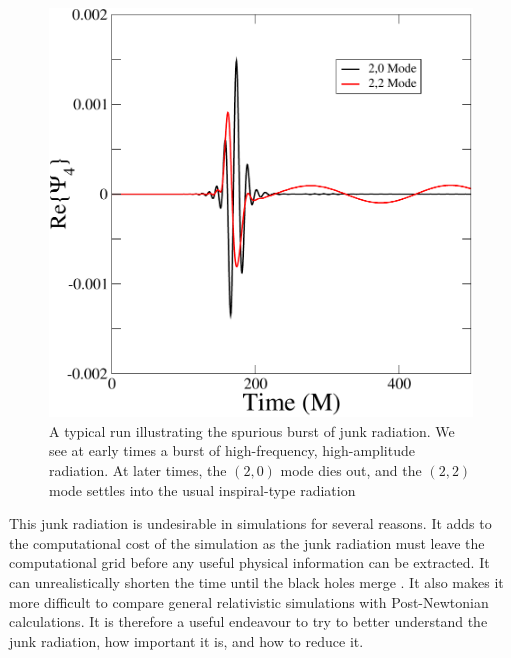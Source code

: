 \begin{figure}
 \includegraphics[scale=0.95]{chap5/Typical}
  \caption[A typical run illustrating junk radation.]{A typical run illustrating the spurious burst of junk radiation. We see at early times a burst of high-frequency, high-amplitude radiation. At later times, the $(2,0)$ mode dies out, and the $(2,2)$ mode settles into the usual inspiral-type radiation}
  \label{fig:Typical}
\end{figure}


This junk radiation is undesirable in simulations for several
reasons. It adds to the computational cost of the simulation as the
junk radiation must leave the computational grid before any useful
physical information can be extracted.  It can unrealistically shorten
the time until the black holes
merge . It also makes it more difficult
to compare general relativistic simulations with Post-Newtonian
calculations. It is therefore a useful endeavour to try to better
understand the junk radiation, how important it is, and how to reduce
it.

